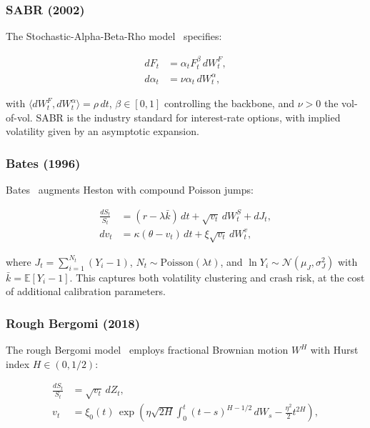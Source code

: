 \documentclass[11pt,a4paper]{article}
\theoremstyle{plain}
\theoremstyle{definition}
\theoremstyle{remark}
\newcommand{\E}{\mathbb{E}}
\newcommand{\inner}[1]{\langle#1\rangle}
\begin{document}
\subsubsection{SABR (2002)}

The Stochastic-Alpha-Beta-Rho model~\citep{hagan2002managing} specifies:

\begin{equation}\label{eq:sabr_sde}
\begin{aligned}
  dF_t &= \alpha_t F_t^\beta\,dW_t^F, \\
  d\alpha_t &= \nu\alpha_t\,dW_t^\alpha,
\end{aligned}
\end{equation}

with $\inner{dW_t^F, dW_t^\alpha} = \rho\,dt$, $\beta \in [0,1]$ controlling the backbone, and $\nu > 0$ the vol-of-vol. SABR is the industry standard for interest-rate options, with implied volatility given by an asymptotic expansion.

\subsubsection{Bates (1996)}

Bates~\citep{bates1996jumps} augments Heston with compound Poisson jumps:

\begin{equation}\label{eq:bates_sde}
\begin{aligned}
  \frac{dS_t}{S_t} &= (r - \lambda\bar{k})\,dt + \sqrt{v_t}\,dW_t^S + dJ_t, \\
  dv_t &= \kappa(\theta - v_t)\,dt + \xi\sqrt{v_t}\,dW_t^v,
\end{aligned}
\end{equation}

where $J_t = \sum_{i=1}^{N_t} (Y_i - 1)$, $N_t \sim \text{Poisson}(\lambda t)$, and $\ln Y_i \sim \mathcal{N}(\mu_J, \sigma_J^2)$ with $\bar{k} = \E[Y_i - 1]$. This captures both volatility clustering and crash risk, at the cost of additional calibration parameters.

\subsubsection{Rough Bergomi (2018)}

The rough Bergomi model~\citep{bayer2016pricing} employs fractional Brownian motion $W^H$ with Hurst index $H \in (0, 1/2)$:

\begin{equation}\label{eq:rbergomi_sde}
\begin{aligned}
  \frac{dS_t}{S_t} &= \sqrt{v_t}\,dZ_t, \\
  v_t &= \xi_0(t)\,\exp\!\left(\eta\sqrt{2H}\int_0^t (t-s)^{H-1/2}\,dW_s - \frac{\eta^2}{2}t^{2H}\right),
\end{aligned}
\end{equation}
\end{document}
